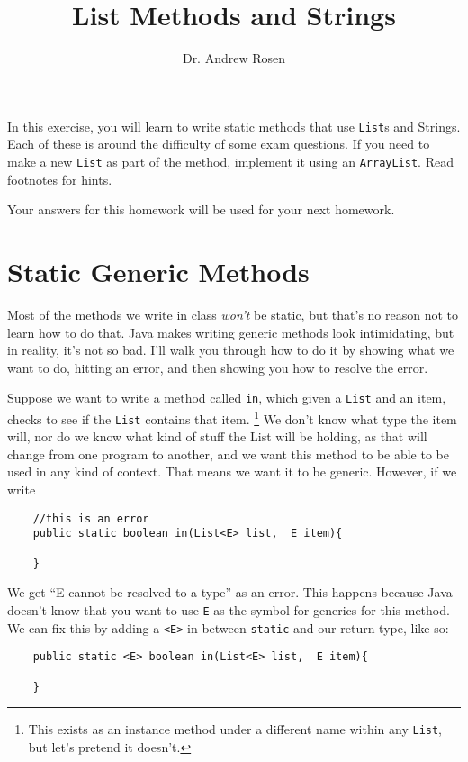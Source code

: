 \documentclass[10pt,letterpaper]{article}
\author{Dr. Andrew Rosen}
\title{List Methods and Strings}
\begin{document}
	
	\maketitle
	
	In this exercise, you will learn to write static methods that use \texttt{List}s and Strings.
	Each of these is around the difficulty of some exam questions.
	If you need to make a new \texttt{List} as part of the method, implement it using an \texttt{ArrayList}.
	Read footnotes for hints.
	
	Your answers for this homework will be used for your next homework.
	
	\newpage
	
	\section{Static Generic Methods}
	Most of the methods we write in class \textit{won't} be static, but that's no reason not to learn how to do that.
	Java makes writing generic methods look intimidating, but in reality, it's not so bad.
	I'll walk you through how to do it by showing what we want to do, hitting an error, and then showing you how to resolve the error.
	
	Suppose we want to write a method called \texttt{in}, which given a \texttt{List} and an item, checks to see if the \texttt{List} contains that item. \footnote{This exists as an instance method under a different name within any \texttt{List}, but let's pretend it doesn't.}
	We don't know what type the item will, nor do we know what kind of stuff the List will be holding, as that will change from one program to another, and we want this method to be able to be used in any kind of context.  
	That means we want it to be generic.
	However, if we write 
	
	\begin{lstlisting}
	//this is an error
	public static boolean in(List<E> list,  E item){
	
	}
	\end{lstlisting}
	We get ``E cannot be resolved to a type'' as an error.
	This happens because Java doesn't know that you want to use \texttt{E} as the symbol for generics for this method.
	We can fix this by adding a \texttt{<E>} in between \texttt{static} and our return type, like so:
	
	\begin{lstlisting}
	public static <E> boolean in(List<E> list,  E item){
	
	}
	\end{lstlisting}
	
\end{document}
